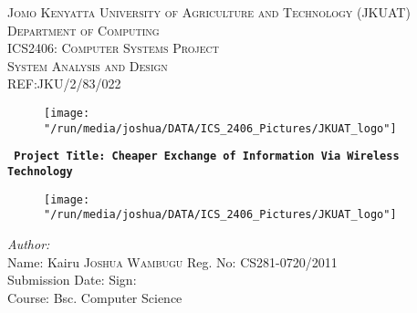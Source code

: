 \documentclass[12pt,svgnames,smaller]{article} %
\begin{document}
	\begin{titlepage}
		\begin{center}
			
			
			\textsc{\large Jomo Kenyatta University of Agriculture and Technology (JKUAT)}\\[0.4cm]
			\textsc{\large Department of Computing}\\[0.4cm]
			\textsc{\large ICS2406: Computer Systems Project  }\\[0.3cm]
			\textsc{\large System Analysis and Design}\\[0.3cm]
			\textsc{\large REF:JKU/2/83/022 }\\[0.2 cm]
			
			
			\begin{figure}
				\centering
				\texttt{[image: "/run/media/joshua/DATA/ICS\_2406\_Pictures/JKUAT\_logo"]}
				\label{fig:JKUAT_logo}
			\end{figure}
			\textbf{\texttt{ Project Title: Cheaper Exchange of Information Via Wireless Technology }}{\vspace*{20 mm}}
		\end{center}
		
		
		\begin{figure}
			\centering
			\texttt{[image: "/run/media/joshua/DATA/ICS\_2406\_Pictures/JKUAT\_logo"]}
			\label{fig:JKUAT_logo}
		\end{figure}
		
		
		\begin{minipage}{1.0\textwidth}	
			\begin{flushleft} \large
				\emph{Author:}\\
				Name: Kairu \textsc{Joshua Wambugu} Reg. No: CS281-0720/2011 \\
				Submission Date: \hrulefill  Sign: \hrulefill \\
				Course: Bsc. Computer Science
			\end{flushleft}
		\end{minipage}
		

\end{titlepage}
\end{document}
